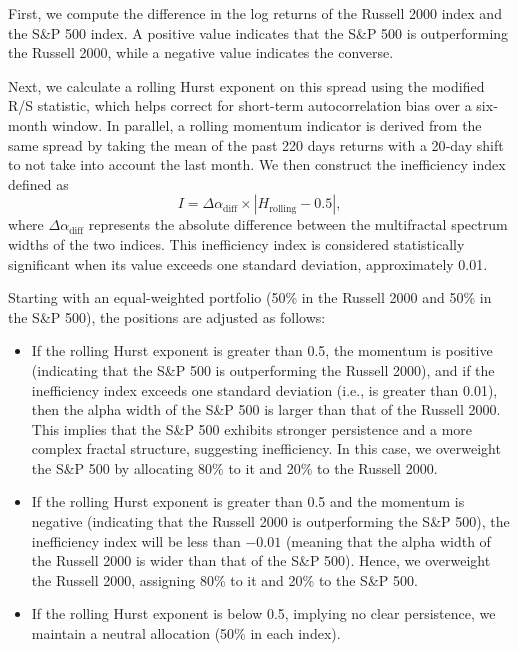 \documentclass[11pt]{extarticle}
\begin{document}
First, we compute the difference in the log returns of the Russell 2000 index and the S\&P 500 index. A positive value
indicates that the S\&P 500 is outperforming the Russell 2000, while a negative value indicates the converse.

Next, we calculate a rolling Hurst exponent on this spread using the modified R/S statistic, which helps correct for
short-term autocorrelation bias over a six‐month window. In parallel, a rolling momentum indicator is derived from the
same spread by taking the mean of the past 220 days returns with a 20‐day shift to not take into account the last month.
We then construct the inefficiency index defined as
\[
I = \Delta\alpha_{\text{diff}} \times \left|H_{\text{rolling}} - 0.5\right|,
\]
where \(\Delta \alpha_{\text{diff}}\) represents the absolute difference between the multifractal spectrum widths of the two
indices. This inefficiency index is considered statistically significant when its value exceeds one standard deviation, approximately 0.01.

Starting with an equal-weighted portfolio (50\% in the Russell 2000 and 50\% in the S\&P 500), the positions are adjusted as follows:

\begin{itemize}
    \item If the rolling Hurst exponent is greater than 0.5, the momentum is positive (indicating that the S\&P 500 is
    outperforming the Russell 2000), and if the inefficiency index exceeds one standard deviation (i.e., is greater than 0.01),
    then the alpha width of the S\&P 500 is larger than that of the Russell 2000. This implies that the S\&P 500 exhibits stronger
    persistence and a more complex fractal structure, suggesting inefficiency. In this case, we overweight the S\&P 500 by allocating
    80\% to it and 20\% to the Russell 2000.

    \item If the rolling Hurst exponent is greater than 0.5 and the momentum is negative (indicating that the Russell 2000 is
    outperforming the S\&P 500), the inefficiency index will be less than \(-0.01\) (meaning that the alpha width of the
    Russell 2000 is wider than that of the S\&P 500). Hence, we overweight the Russell 2000, assigning 80\% to it and 20\% to the S\&P 500.

    \item If the rolling Hurst exponent is below 0.5, implying no clear persistence, we maintain a neutral allocation (50\% in each index).
\end{itemize}
\end{document}
